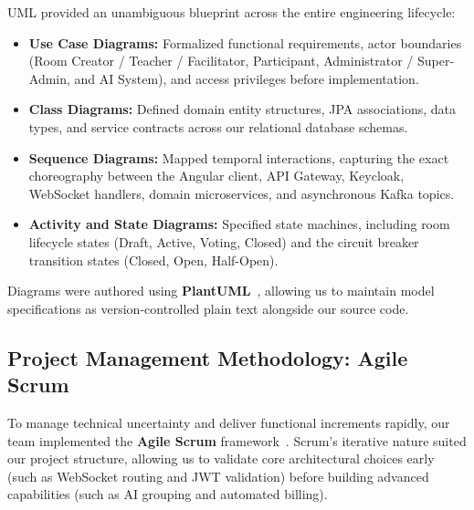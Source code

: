 UML provided an unambiguous blueprint across the entire engineering lifecycle:
\begin{itemize}[leftmargin=1.5em]
    \item \textbf{Use Case Diagrams:} Formalized functional requirements, actor boundaries (Room Creator / Teacher / Facilitator, Participant, Administrator / Super-Admin, and AI System), and access privileges before implementation.
    \item \textbf{Class Diagrams:} Defined domain entity structures, JPA associations, data types, and service contracts across our relational database schemas.
    \item \textbf{Sequence Diagrams:} Mapped temporal interactions, capturing the exact choreography between the Angular client, API Gateway, Keycloak, WebSocket handlers, domain microservices, and asynchronous Kafka topics.
    \item \textbf{Activity and State Diagrams:} Specified state machines, including room lifecycle states (Draft, Active, Voting, Closed) and the circuit breaker transition states (Closed, Open, Half-Open).
\end{itemize}

Diagrams were authored using \textbf{PlantUML}~\cite{plantuml2026}, allowing us to maintain model specifications as version-controlled plain text alongside our source code.

\subsection{Project Management Methodology: Agile Scrum}
\label{subsec:scrum_methodology}

To manage technical uncertainty and deliver functional increments rapidly, our team implemented the \textbf{Agile Scrum} framework~\cite{schwaber2020scrum}. Scrum's iterative nature suited our project structure, allowing us to validate core architectural choices early (such as WebSocket routing and JWT validation) before building advanced capabilities (such as AI grouping and automated billing).

